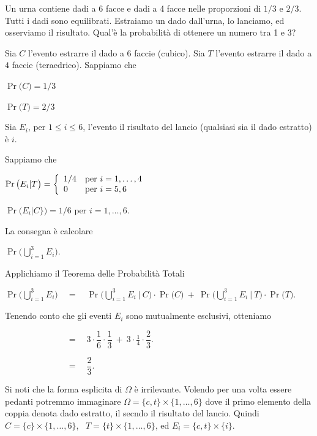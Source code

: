 \documentclass[11pt,openany]{book}
\begin{document}
Un urna contiene dadi a 6 facce e dadi a 4 facce nelle proporzioni di $1/3$ e $2/3$.
Tutti i dadi sono equilibrati.
Estraiamo un dado dall'urna, lo lanciamo, ed osserviamo il risultato.
Qual'è la probabilità di ottenere un numero tra 1 e 3?

\begin{soluzione}
Sia $C$ l'evento estrarre il dado a $6$ faccie (cubico). 
Sia $T$ l'evento estrarre il dado a $4$ faccie (teraedrico). 
Sappiamo che 

\qquad$\Pr\big(C\big)=1/3$ 

\qquad$\Pr\big(T\big)=2/3$ 

Sia $E_i$, per $1\le i\le 6$, l'evento  il risultato del lancio (qualsiasi sia il dado estratto) \`e $i$.

Sappiamo che

\qquad$\Pr\big(E_i\vert T\big)=\left\{
\begin{array}[c]{ll}
    1/4&\textrm{per }i=1,\dots,4\\
    0&\textrm{per }i=5, 6\\
\end{array}\right.$

\qquad$\Pr\big(E_i\vert C\}\big)=1/6$ per $i=1,\dots,6$.

La consegna è calcolare

\qquad$\displaystyle\Pr\bigg(\bigcup_{i=1}^3E_i\bigg)$.

Applichiamo il Teorema delle Probabilità Totali

\qquad$\displaystyle\Pr\bigg(\bigcup_{i=1}^3E_i\bigg)\quad=\quad
\Pr\bigg(\bigcup_{i=1}^3E_i\ \Big|\ C\bigg)\cdot\Pr\big(C\big)\ +\ 
\Pr\bigg(\bigcup_{i=1}^3E_i\ \Big|\ T\bigg)\cdot\Pr\big(T\big)
$.

Tenendo conto che gli eventi $E_i$ sono mutualmente esclusivi, otteniamo

\qquad$\displaystyle\phantom{\Pr\bigg(\bigcup_{i=1}^3E_i\bigg)}\quad=\quad
3\cdot\dfrac16\cdot\dfrac13\ +\ 
3\cdot\frac14\cdot\dfrac23
$.

\qquad$\displaystyle\phantom{\Pr\bigg(\bigcup_{i=1}^3E_i\bigg)}\quad=\quad
\dfrac{2}{3}
$.
\end{soluzione}

Si noti che la forma esplicita di $\Omega$ \`e irrilevante.
Volendo per una volta essere pedanti potremmo immaginare $\Omega=\{c,t\}\times\{1,\dots,6\}$ dove il primo elemento della coppia denota dado estratto, il secndo il risultato del lancio.
Quindi $C=\{c\}\times\{1,\dots,6\}$, \ $T=\{t\}\times\{1,\dots,6\}$, ed $E_i=\{c,t\}\times\{i\}$.
\end{document}
